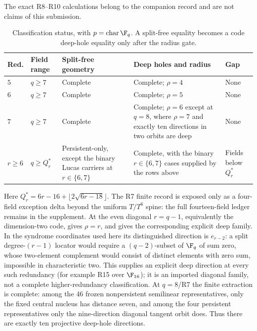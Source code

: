 The exact R8--R10 calculations belong to the companion record and are not
claims of this submission.

\begin{table}[H]
\centering
\small
\caption{Classification status, with $p=\operatorname{char}\F_q$.  A
split-free equality becomes a code deep-hole equality only after the radius
gate.}
\label{tab:classification-status}
\setlength{\tabcolsep}{3pt}
\begin{tabular}{p{}p{}
                p{}p{}
                p{}}
\toprule
Red. & Field range & Split-free geometry & Deep holes and radius
& Gap\\
\midrule
\(5\) & \(q\geq7\) & Complete & Complete; \(\rho=4\) & None\\
\(6\) & \(q\geq7\) & Complete & Complete; \(\rho=5\) & None\\
\(7\) & \(q\geq7\) & Complete & Complete; \(\rho=6\) except at $q=8$,
where \(\rho=7\) and exactly ten directions in two orbits are deep & None\\
\(r\geq6\) & \(q\geq Q_r^*\) & Persistent-only, except the binary Lucas
carriers at \(r\in\{6,7\}\) & Complete, with the binary \(r\in\{6,7\}\)
cases supplied by the rows above & Fields below \(Q_r^*\)\\
\bottomrule
\end{tabular}
\end{table}

Here \(Q_r^*=6r-16+\lfloor2\sqrt{6r-18}\rfloor\).  The R7 finite record
is exposed only as a four-field exception delta beyond the uniform
\(T/T^6\) spine: the full fourteen-field ledger remains in the supplement.
At the even diagonal $r=q-1$, equivalently the dimension-two code,
\cite[Thm.~17(1)]{WuDingChen2023} gives \(\rho=r\), and
\cite{Xu2023} gives the corresponding explicit deep family.  In the syndrome
coordinates used here its distinguished direction is $e_{r-2}$: a split
degree-$(r-1)$ locator would require a $(q-2)$-subset of \(\F_q\) of sum
zero, whose two-element complement would consist of distinct elements with
zero sum, impossible in characteristic two.  This supplies an explicit deep
direction at every such redundancy (for example R15 over \(\F_{16}\)); it is
an imported diagonal family, not a complete higher-redundancy classification.
At $q=8$/R7 the finite extraction is complete: among the 46 frozen
nonpersistent semilinear representatives, only the fixed central nucleus has
distance seven, and among the four persistent representatives only the
nine-direction diagonal tangent orbit does. Thus there are exactly ten
projective deep-hole directions.

